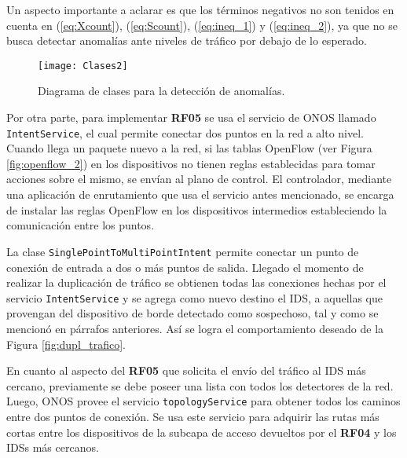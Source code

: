 Un aspecto importante a aclarar es que los términos negativos no son tenidos en
cuenta en (\ref{eq:Xcount}), (\ref{eq:Scount}), (\ref{eq:ineq_1}) y
(\ref{eq:ineq_2}), ya que no se busca detectar anomalías ante niveles de
tráfico por debajo de lo esperado.

\begin{figure}[H]
	\centering 
	\texttt{[image: Clases2]}
	\caption{Diagrama de clases para la detección de anomalías.}
	\label{fig:diagrama_clases_1_2}
\end{figure}


Por otra parte, para implementar \textbf{RF05} se usa el servicio de ONOS llamado
\verb|IntentService|, el cual permite conectar dos puntos en la red a alto
nivel. Cuando llega un paquete nuevo a la red, si las tablas OpenFlow (ver
Figura \ref{fig:openflow_2}) en los dispositivos no tienen reglas establecidas
para tomar acciones sobre el mismo, se envían al plano de control. El
controlador, mediante una aplicación de enrutamiento que usa el servicio antes
mencionado, se encarga de instalar las reglas OpenFlow en los dispositivos
intermedios estableciendo la comunicación entre los puntos.

La clase \verb|SinglePointToMultiPointIntent| permite conectar un punto
de conexión de entrada a dos o más puntos de salida. Llegado el momento de
realizar la duplicación de tráfico se obtienen todas las conexiones hechas por
el servicio \verb|IntentService| y se agrega como nuevo destino el IDS, a
aquellas que provengan del dispositivo de borde detectado como sospechoso,
tal y como se mencionó en párrafos anteriores. Así se logra el comportamiento
deseado de la Figura \ref{fig:dupl_trafico}.

En cuanto al aspecto del \textbf{RF05} que solicita el envío del tráfico al IDS
más cercano, previamente se debe poseer una lista con todos los detectores de la
red. Luego, ONOS provee el servicio \verb|topologyService| para obtener todos
los caminos entre dos puntos de conexión. Se usa este servicio para adquirir las
rutas más cortas entre los dispositivos de la subcapa de acceso devueltos por el
\textbf{RF04} y los IDSs más cercanos.

